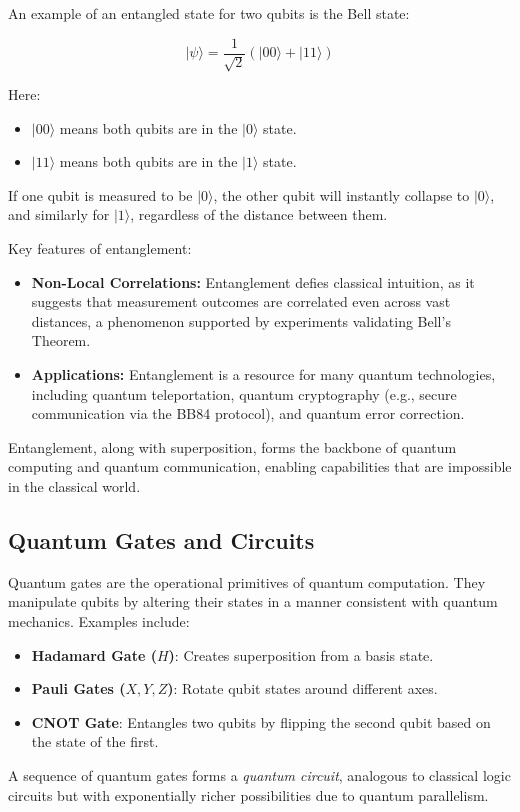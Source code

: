\documentclass[11pt]{article}
\theoremstyle{definition}
\begin{document}
An example of an entangled state for two qubits is the Bell state:

\begin{equation}
|\psi\rangle = \frac{1}{\sqrt{2}} (|00\rangle + |11\rangle)
\end{equation}

Here:
\begin{itemize}
    \item $|00\rangle$ means both qubits are in the $|0\rangle$ state.
    \item $|11\rangle$ means both qubits are in the $|1\rangle$ state.
\end{itemize}

If one qubit is measured to be $|0\rangle$, the other qubit will instantly collapse to $|0\rangle$, and similarly for $|1\rangle$, regardless of the distance between them.

Key features of entanglement:
\begin{itemize}
    \item \textbf{Non-Local Correlations:} Entanglement defies classical intuition, as it suggests that measurement outcomes are correlated even across vast distances, a phenomenon supported by experiments validating Bell's Theorem.
    \item \textbf{Applications:} Entanglement is a resource for many quantum technologies, including quantum teleportation, quantum cryptography (e.g., secure communication via the BB84 protocol), and quantum error correction.
\end{itemize}

Entanglement, along with superposition, forms the backbone of quantum computing and quantum communication, enabling capabilities that are impossible in the classical world.




\subsection*{Quantum Gates and Circuits}
Quantum gates are the operational primitives of quantum computation. They manipulate qubits by altering their states in a manner consistent with quantum mechanics. Examples include:
\begin{itemize}
    \item \textbf{Hadamard Gate ($H$)}: Creates superposition from a basis state.
    \item \textbf{Pauli Gates ($X, Y, Z$)}: Rotate qubit states around different axes.
    \item \textbf{CNOT Gate}: Entangles two qubits by flipping the second qubit based on the state of the first.
\end{itemize}
A sequence of quantum gates forms a \textit{quantum circuit}, analogous to classical logic circuits but with exponentially richer possibilities due to quantum parallelism.
\end{document}
